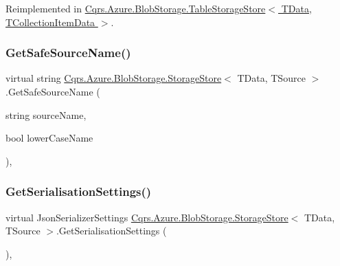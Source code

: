 Reimplemented in \hyperlink{classCqrs_1_1Azure_1_1BlobStorage_1_1TableStorageStore_a7b9e49aa8017ff3c55b184b956a150d0_a7b9e49aa8017ff3c55b184b956a150d0}{Cqrs.\+Azure.\+Blob\+Storage.\+Table\+Storage\+Store$<$ T\+Data, T\+Collection\+Item\+Data $>$}.

\mbox{\label{classCqrs_1_1Azure_1_1BlobStorage_1_1StorageStore_ad3364a0c84d5ed666615b9528d6f640e_ad3364a0c84d5ed666615b9528d6f640e}} 
\subsubsection{\texorpdfstring{Get\+Safe\+Source\+Name()}{GetSafeSourceName()}\hspace{0.1cm}{\footnotesize\ttfamily [2/2]}}
{\footnotesize\ttfamily virtual string \hyperlink{classCqrs_1_1Azure_1_1BlobStorage_1_1StorageStore}{Cqrs.\+Azure.\+Blob\+Storage.\+Storage\+Store}$<$ T\+Data, T\+Source $>$.Get\+Safe\+Source\+Name (\begin{DoxyParamCaption}\item[{string}]{source\+Name,  }\item[{bool}]{lower\+Case\+Name }\end{DoxyParamCaption})\hspace{0.3cm}{\ttfamily [protected]}, {\ttfamily [virtual]}}

\mbox{\label{classCqrs_1_1Azure_1_1BlobStorage_1_1StorageStore_a9ded88f1b48cf61b3be826fb0997adfb_a9ded88f1b48cf61b3be826fb0997adfb}} 
\subsubsection{\texorpdfstring{Get\+Serialisation\+Settings()}{GetSerialisationSettings()}}
{\footnotesize\ttfamily virtual Json\+Serializer\+Settings \hyperlink{classCqrs_1_1Azure_1_1BlobStorage_1_1StorageStore}{Cqrs.\+Azure.\+Blob\+Storage.\+Storage\+Store}$<$ T\+Data, T\+Source $>$.Get\+Serialisation\+Settings (\begin{DoxyParamCaption}{ }\end{DoxyParamCaption})\hspace{0.3cm}{\ttfamily [protected]}, {\ttfamily [virtual]}}

